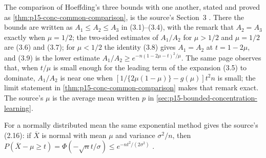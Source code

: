 The comparison of Hoeffding's three bounds with one another, stated and
proved as \cref{thm:p15-conc-common-comparison}, is the source's
Section~3 \cite[pp.~18--19]{Hoeffding1963BoundedSums}. There the bounds
are written as \(A_1\leq A_2\leq A_3\) in (3.1)--(3.4), with the remark
that \(A_2=A_3\) exactly when \(\mu=1/2\); the two-sided estimates of
\(A_1/A_2\) for \(\mu>1/2\) and \(\mu=1/2\) are (3.6) and (3.7); for
\(\mu<1/2\) the identity (3.8) gives \(A_1=A_2\) at \(t=1-2\mu\), and
(3.9) is the lower estimate \(A_1/A_2\geq e^{-n(1-2\mu-t)^2/\mu}\). The
same page observes that, when \(t/\mu\) is small enough for the leading
term of the expansion (3.5) to dominate, \(A_1/A_2\) is near one when
\([1/\{2\mu(1-\mu)\}-g(\mu)]t^2n\) is small; the limit statement in
\cref{thm:p15-conc-common-comparison} makes that remark exact. The
source's \(\mu\) is the average mean written \(p\) in
\cref{sec:p15-bounded-concentration-learning}.

For a normally distributed mean the same exponential method gives the
source's (2.16):
if \(\overline X\) is normal with mean \(\mu\) and variance \(\sigma^2/n\),
then
\(P(\overline X-\mu\geq t)=\Phi(-\sqrt nt/\sigma)\leq e^{-nt^2/(2\sigma^2)}\)
\cite[p.~17]{Hoeffding1963BoundedSums}.

